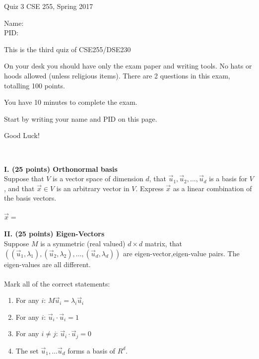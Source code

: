 \documentclass[10pt]{article}
\begin{document}
\setlength\parindent{0pt}
\thispagestyle{empty}

{\textbf \Large Quiz 3} \hfill CSE 255, Spring 2017
\\

\vspace{.1in}

Name: \underline{\hspace{3in}}
\\

PID: \underline{\hspace{3.15in}}

\vspace{.1in}

{\small \setlength\parindent{20pt}This is the third quiz of CSE255/DSE230

On your desk you should have only the exam paper and writing tools.
No hats or hoods allowed (unless religious items).
There are 2 questions in this exam, totalling 100 points.

You have 10 minutes to complete the exam.

Start by writing your name and PID on this page.

Good Luck!}\\
\underline{\hspace{6in}}

\newcommand{\uu}{\vec{u}}
\newcommand{\xx}{\vec{x}}
\newcommand{\yy}{\vec{y}}

\vspace{.1in}
\noindent
{\bf I. (25 points) Orthonormal basis} \\
Suppose that $V$ is a vector space of dimension $d$, that
$\uu_1,\uu_2,\ldots,\uu_d$ is a basis for $V$, and that $\xx \in V$ is
an arbitrary vector in $V$. Express $\xx$ as a linear combination of
the basis vectors.\\
~\\
\underline{$\xx=$\hspace{6in}}\\
~\\
\vspace{.1in}
\noindent
{\bf II. (25 points) Eigen-Vectors} \\
Suppose $M$ is a symmetric (real valued) $d \times d$ matrix, that
$((\uu_1,\lambda_1),(\uu_2,\lambda_2),\ldots,(\uu_d,\lambda_d))$  are
eigen-vector,eigen-value pairs. The eigen-values are all different.\\
~\\
Mark all of the correct statements:
\begin{enumerate}
\item For any $i$: $M \uu_i = \lambda_i \uu_i$
\item For any $i$: $\uu_i \cdot \uu_i =1$
\item For any $i \neq j$: $\uu_i \cdot \uu_j=0$
\item The set $\uu_1,\ldots \uu_d$ forms a basis of $R^d$.
\end{enumerate}
\end{document}

